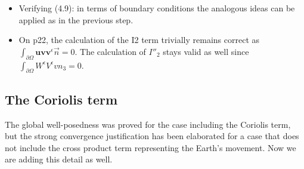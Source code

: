 \documentclass[11pt]{article}
\begin{document}
\begin{itemize}
   using the divergence-free condition and $\mathbf{u}^\epsilon = 0$ on $\partial \Omega.$
   
   \item Verifying (4.9): in terms of boundary conditions the analogous ideas can be applied as in the previous step.
   
   \item On p22, the calculation of the I2 term trivially remains correct as $\int_{\partial \Omega} \mathbf{u} \mathbf{v} \mathbf{v}^\epsilon \vec{n} = 0.$ The calculation of $I''_2$ stays valid as well since
   $\int_{\partial \Omega} W^\epsilon V^\epsilon v n_3 = 0.$

\end{itemize}

\subsection{The Coriolis term}

The global well-posedness was proved for the case including the Coriolis term, but the strong convergence justification has been elaborated for a case that does not include the cross product term representing the Earth's movement. Now we are adding this detail as well.
\end{document}
